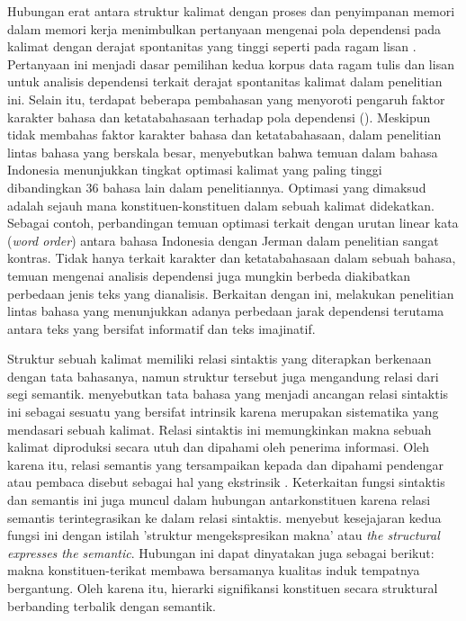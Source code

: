 Hubungan erat antara struktur kalimat dengan proses dan penyimpanan memori dalam memori kerja menimbulkan pertanyaan mengenai pola dependensi pada kalimat dengan derajat spontanitas yang tinggi seperti pada ragam lisan \citep{abney1991memory}. Pertanyaan ini menjadi dasar  pemilihan kedua korpus data ragam tulis dan lisan untuk analisis dependensi terkait derajat spontanitas kalimat dalam penelitian ini. Selain itu, terdapat beberapa pembahasan yang menyoroti pengaruh faktor karakter bahasa dan ketatabahasaan terhadap pola dependensi (\citealp{hawkins2014cross, jiang2015effects, wang2017effects}). Meskipun tidak membahas faktor karakter bahasa dan ketatabahasaan, dalam penelitian lintas bahasa yang berskala besar, \cite{futrell2015large} menyebutkan bahwa temuan dalam bahasa Indonesia menunjukkan tingkat optimasi kalimat yang paling tinggi dibandingkan 36 bahasa lain dalam penelitiannya. Optimasi yang dimaksud adalah sejauh mana konstituen-konstituen dalam sebuah kalimat didekatkan. Sebagai contoh, perbandingan temuan optimasi terkait dengan urutan linear kata (\textit{word order}) antara bahasa Indonesia dengan Jerman dalam penelitian \cite{futrell2015large} sangat kontras. Tidak hanya terkait karakter dan ketatabahasaan dalam sebuah bahasa, temuan mengenai analisis dependensi juga mungkin berbeda diakibatkan perbedaan jenis teks yang dianalisis. Berkaitan dengan ini, \cite{wang2017effects} melakukan penelitian lintas bahasa yang menunjukkan adanya perbedaan jarak dependensi terutama antara teks yang bersifat informatif dan teks imajinatif.

Struktur sebuah kalimat memiliki relasi sintaktis yang diterapkan berkenaan dengan tata bahasanya, namun struktur tersebut juga mengandung relasi dari segi semantik. \cite{tesniere1959elements} menyebutkan tata bahasa yang menjadi ancangan relasi sintaktis ini sebagai sesuatu yang bersifat intrinsik karena merupakan sistematika yang mendasari sebuah kalimat. Relasi sintaktis ini memungkinkan makna sebuah kalimat diproduksi secara utuh dan dipahami oleh penerima informasi. Oleh karena itu, relasi semantis yang tersampaikan kepada dan dipahami pendengar atau pembaca disebut sebagai hal yang ekstrinsik \citep{tesniere1959elements}. Keterkaitan fungsi sintaktis dan semantis ini juga muncul dalam hubungan antarkonstituen karena relasi semantis terintegrasikan ke dalam relasi sintaktis. \cite{tesniere1959elements} menyebut kesejajaran kedua fungsi ini dengan istilah 'struktur mengekspresikan makna' atau \textit{the structural expresses the semantic}. Hubungan ini dapat dinyatakan juga sebagai berikut: makna \gls{konstituen-terikat} membawa bersamanya kualitas induk tempatnya bergantung. Oleh karena itu, hierarki signifikansi konstituen secara struktural berbanding terbalik dengan semantik.

